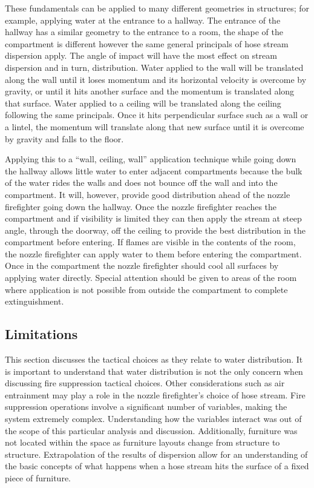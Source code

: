 \documentclass[12pt,oneside]{book}
\begin{document}
These fundamentals can be applied to many different geometries in structures; for example, applying water at the entrance to a hallway. The entrance of the hallway has a similar geometry to the entrance to a room, the shape of the compartment is different however the same general principals of hose stream dispersion apply. The angle of impact will have the most effect on stream dispersion and in turn,  distribution.  Water applied to the wall will be translated along the wall until it loses momentum and its horizontal velocity is overcome by gravity, or until it hits another surface and the momentum is translated along that surface. Water applied to a ceiling will be translated along the ceiling following the same principals. Once it hits perpendicular surface such as a wall or a lintel, the momentum will translate along that new surface until it is overcome by gravity and falls to the floor. 

Applying this to a ``wall, ceiling, wall'' application technique while going down the hallway allows little water to enter adjacent compartments because the bulk of the water rides the walls and does not bounce off the wall and into the compartment. It will, however, provide good distribution ahead of the nozzle firefighter going down the hallway. Once the nozzle firefighter reaches the compartment and if visibility is limited they can then apply the stream at steep angle, through the doorway, off the ceiling to provide the best distribution in the compartment before entering. If flames are visible in the contents of the room, the nozzle firefighter can apply water to them before entering the compartment. Once in the compartment the nozzle firefighter should cool all surfaces by applying water directly. Special attention should be given to areas of the room where application is not possible from outside the compartment to complete extinguishment.

\clearpage

\subsection{Limitations}

This section discusses the tactical choices as they relate to water distribution. It is important to understand that water distribution is not the only concern when discussing fire suppression tactical choices. Other considerations such as air entrainment may play a role in the nozzle firefighter's choice of hose stream. Fire suppression operations involve a significant number of variables, making the system extremely complex. Understanding how the variables interact was out of the scope of this particular analysis and discussion. Additionally, furniture was not located within the space as furniture layouts change from structure to structure. Extrapolation of the results of dispersion allow for an understanding of the basic concepts of what happens when a hose stream hits the surface of a fixed piece of furniture. 
\end{document}
